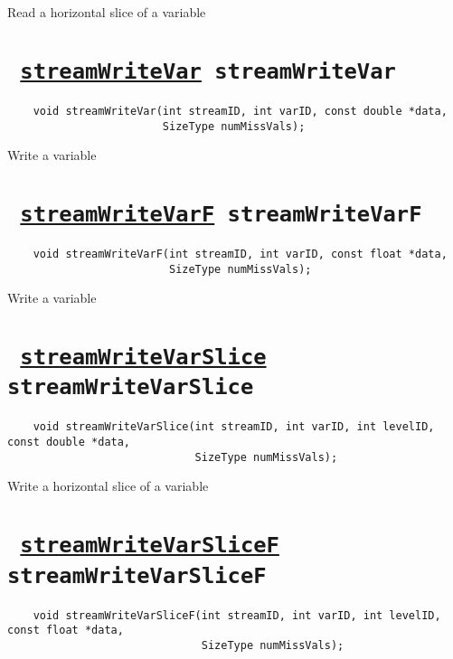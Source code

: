 Read a horizontal slice of a variable
\ifpdfoutput{}{(\ref{streamReadVarSliceF})}


\section*{\texttt{ 
\ifpdf
\hyperref[streamWriteVar]{streamWriteVar}
\else
streamWriteVar
\fi
}}
\begin{verbatim}
    void streamWriteVar(int streamID, int varID, const double *data, 
                        SizeType numMissVals);
\end{verbatim}

Write a variable
\ifpdfoutput{}{(\ref{streamWriteVar})}


\section*{\texttt{ 
\ifpdf
\hyperref[streamWriteVarF]{streamWriteVarF}
\else
streamWriteVarF
\fi
}}
\begin{verbatim}
    void streamWriteVarF(int streamID, int varID, const float *data, 
                         SizeType numMissVals);
\end{verbatim}

Write a variable
\ifpdfoutput{}{(\ref{streamWriteVarF})}


\section*{\texttt{ 
\ifpdf
\hyperref[streamWriteVarSlice]{streamWriteVarSlice}
\else
streamWriteVarSlice
\fi
}}
\begin{verbatim}
    void streamWriteVarSlice(int streamID, int varID, int levelID, const double *data, 
                             SizeType numMissVals);
\end{verbatim}

Write a horizontal slice of a variable
\ifpdfoutput{}{(\ref{streamWriteVarSlice})}


\section*{\texttt{ 
\ifpdf
\hyperref[streamWriteVarSliceF]{streamWriteVarSliceF}
\else
streamWriteVarSliceF
\fi
}}
\begin{verbatim}
    void streamWriteVarSliceF(int streamID, int varID, int levelID, const float *data, 
                              SizeType numMissVals);
\end{verbatim}

